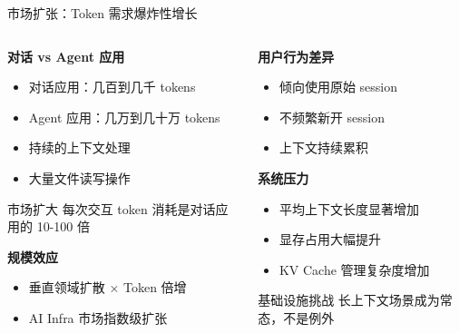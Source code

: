 \documentclass[aspectratio=169,xcolor=dvipsnames]{beamer}
\begin{document}
\begin{frame}{市场扩张：Token 需求爆炸性增长}
  \begin{columns}
    \begin{column}{0.48\textwidth}
      \textbf{对话 vs Agent 应用}
      \begin{itemize}
        \item 对话应用：几百到几千 tokens
        \item Agent 应用：几万到几十万 tokens
        \item 持续的上下文处理
        \item 大量文件读写操作
      \end{itemize}

      \vspace{0.3cm}

      \begin{alertblock}{市场扩大}
        每次交互 token 消耗是对话应用的 10-100 倍
      \end{alertblock}

      \vspace{0.3cm}

      \textbf{规模效应}
      \begin{itemize}
        \item 垂直领域扩散 × Token 倍增
        \item AI Infra 市场指数级扩张
      \end{itemize}
    \end{column}
    \begin{column}{0.48\textwidth}
      \textbf{用户行为差异}
      \begin{itemize}
        \item 倾向使用原始 session
        \item 不频繁新开 session
        \item 上下文持续累积
      \end{itemize}

      \vspace{0.3cm}

      \textbf{系统压力}
      \begin{itemize}
        \item 平均上下文长度显著增加
        \item 显存占用大幅提升
        \item KV Cache 管理复杂度增加
      \end{itemize}

      \vspace{0.3cm}

      \begin{exampleblock}{基础设施挑战}
        长上下文场景成为常态，不是例外
      \end{exampleblock}
    \end{column}
  \end{columns}
\end{frame}
\end{document}
